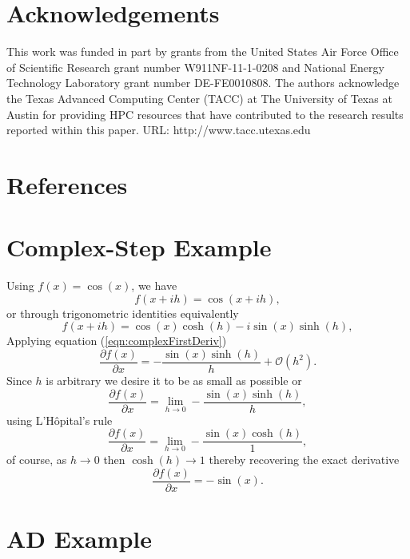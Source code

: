\documentclass[preprint,12pt]{elsarticle}
\begin{document}
\section{Acknowledgements}
\label{sec:ack}
This work was funded in part by grants from the United States Air Force Office of Scientific Research grant number W911NF-11-1-0208 and National Energy Technology Laboratory grant number DE-FE0010808. The authors acknowledge the Texas Advanced Computing Center (TACC) at The University of Texas at Austin for providing HPC resources that have contributed to the research results reported within this paper. URL: http://www.tacc.utexas.edu


\section{References}




\appendix
\renewcommand*{\thesection}{\Alph{section}}
%
\section{Complex-Step Example}
\label{sec:appendixA}
%
Using $f(x) = \cos(x)$, we have
%
\[
f (x + i h) = \cos(x + i h),
\]
%
or through trigonometric identities equivalently
%
\[
f(x + i h) = \cos(x) \cosh(h) - i \sin(x) \sinh(h),
\]
%
Applying equation (\ref{eqn:complexFirstDeriv})
\[
    \frac{\partial f(x)}{\partial x} = - \frac{\sin(x) \sinh(h)}{h} + \mathcal{O}(h^2).
\]
Since $h$ is arbitrary we desire it to be as small as possible or
\[
\frac{\partial f(x)}{\partial x} = \lim_{h \to 0} - \frac{\sin(x) \sinh(h)}{h},
\]
using L'H\^opital's rule
\[
\frac{\partial f(x)}{\partial x} = \lim_{h \to 0} - \frac{\sin(x) \cosh(h)}{1},
\]
of course, as $h \to 0$ then $\cosh(h) \to 1$ thereby recovering the exact derivative
\[
\frac{\partial f(x)}{\partial x} =-\sin(x).
\]

\section{AD Example}
\label{sec:appendixB}
\end{document}

